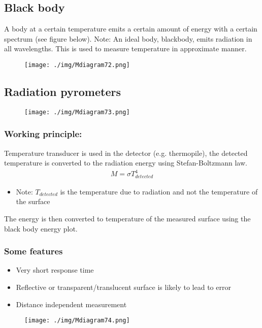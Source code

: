 \subsection{Black body}
A body at a certain temperature emits a certain amount of energy with a certain spectrum (see figure below). Note: An ideal body, blackbody, emits radiation in all wavelengths. This is used to measure temperature in approximate manner.
\begin{figure}[H]
  \centering
  \texttt{[image: ./img/Mdiagram72.png]}
\end{figure}
\subsection{Radiation pyrometers}
\begin{figure}[H]
  \centering
  \texttt{[image: ./img/Mdiagram73.png]}
\end{figure}
\subsubsection{Working principle:}
Temperature transducer is used in the detector (e.g. thermopile), the detected temperature is converted to the radiation energy using Stefan-Boltzmann law.
\begin{gather}
  M = \sigma T_{detected}^4
\end{gather}
\begin{itemize}
  \item Note: $T_{detected}$ is the  temperature due to radiation and not the temperature of the surface
\end{itemize}
The energy is then converted to temperature of the measured surface using the black body energy plot.
\subsubsection{Some features}
\begin{itemize}
  \item Very short response time
  \item Reflective or transparent/translucent surface is likely to lead to error
  \item Distance independent measurement
\end{itemize}
\begin{figure}[H]
  \centering
  \texttt{[image: ./img/Mdiagram74.png]}
\end{figure}
